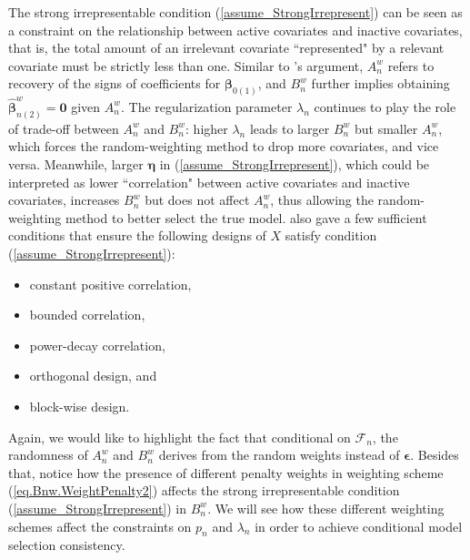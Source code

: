 \documentclass[ejs,authoryear,linksfromyear]{imsart}
\numberwithin{equation}{section}
\theoremstyle{plain}
\begin{document}
The strong irrepresentable condition (\ref{assume_StrongIrrepresent}) can be seen as a constraint on the relationship between active covariates and inactive covariates, that is, the total amount of an irrelevant covariate ``represented" by a relevant covariate must be strictly less than one. Similar to \citet{BinYu}'s argument, $A_n^w$ refers to recovery of the signs of coefficients for $\bm{\beta}_{0(1)}$, and $B_n^w$ further implies obtaining $\widehat{\bm{\beta}}^w_{n(2)} = \bm{0}$ given $A_n^w$. The regularization parameter $\lambda_n$ continues to play the role of trade-off between $A_n^w$ and $B_n^w$: higher $\lambda_n$ leads to larger $B_n^w$ but smaller $A_n^w$, which forces the random-weighting method to drop more covariates, and vice versa. Meanwhile, larger $\bm{\eta}$ in (\ref{assume_StrongIrrepresent}), which could be interpreted as lower ``correlation" between active covariates and inactive covariates, increases $B_n^w$ but does not affect $A_n^w$, thus allowing the random-weighting method to better select the true model. \citet{BinYu} also gave a few sufficient conditions that ensure the following designs of $X$ satisfy condition (\ref{assume_StrongIrrepresent}):
\begin{itemize}
	\item constant positive correlation,
	\item bounded correlation,
	\item power-decay correlation, 
	\item orthogonal design, and
	\item block-wise design. 
\end{itemize} 
Again, we would like to highlight the fact that conditional on $\mathcal{F}_n$, the randomness of $A_n^w$ and $B_n^w$ derives from the random weights instead of $\bm{\epsilon}$. Besides that, notice how the presence of different penalty weights in weighting scheme (\ref{eq.Bnw.WeightPenalty2}) affects the strong irrepresentable condition (\ref{assume_StrongIrrepresent}) in $B^w_n$. We will see how these different weighting schemes affect the constraints on $p_n$ and $\lambda_n$ in order to achieve conditional model selection consistency.      
\end{document}
